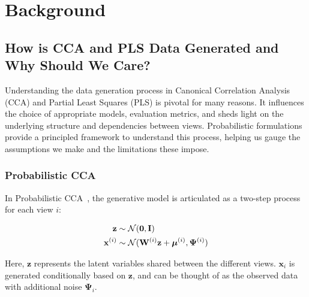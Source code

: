 \section{Background}\label{sec:background}

\subsection{How is CCA and PLS Data Generated and Why Should We Care?}\label{sec:how-is-cca-and-pls-data-generated-and
-why-should-we-care?}

Understanding the data generation process in Canonical Correlation Analysis (CCA) and Partial Least Squares (PLS) is pivotal for many reasons. It influences the choice of appropriate models, evaluation metrics, and sheds light on the underlying structure and dependencies between views. Probabilistic formulations provide a principled framework to understand this process, helping us gauge the assumptions we make and the limitations these impose.

\subsubsection{Probabilistic CCA}

In Probabilistic CCA~\cite{bach2005probabilistic}, the generative model is articulated as a two-step process for each view \(i\):

\begin{align}
    \mathbf{z}& \sim \mathcal{N}(\mathbf{0}, \mathbf{I})                                            \\
    \mathbf{x}^{(i)} & \sim \mathcal{N}(\mathbf{W}^{(i)} \mathbf{z} + \boldsymbol{\mu}^{(i)}, \boldsymbol{\Psi}^{(i)})
\end{align}

Here, \(\mathbf{z}\) represents the latent variables shared between the different views. \(\mathbf{x}_i\) is generated conditionally based on \(\mathbf{z}\), and can be thought of as the observed data with additional noise \(\boldsymbol{\Psi}_i\).


